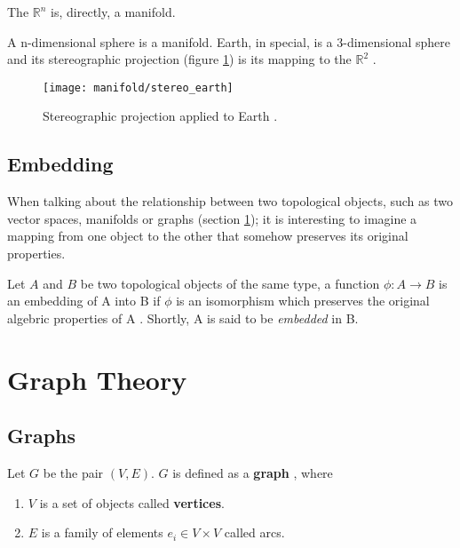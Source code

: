 \begin{example}
	The $\mathbb{R}^n$ is, directly, a manifold.
\end{example}

\begin{example}
	A n-dimensional sphere is a manifold. Earth, in special, is a 3-dimensional sphere and its stereographic projection (figure \ref{fig:stereographic_earth}) is its mapping to the $\mathbb{R}^2$ \cite{stereo_proj}.

	\begin{figure}[H]
		\centering
		\captionsetup{justification=centering}

		\texttt{[image: manifold/stereo\_earth]}
		\caption{Stereographic projection applied to Earth \cite{stereo_proj}.}
		\label{fig:stereographic_earth}
	\end{figure}
\end{example}

\subsection{Embedding}

When talking about the relationship between two topological objects, such as two vector spaces, manifolds or graphs (section \ref{sec:graphs}); it is interesting to imagine a mapping from one object to the other that somehow preserves its original properties.

Let $A$ and $B$ be two topological objects of the same type, a function $\phi \colon A \to B$ is an embedding of A into B if $\phi$ is an isomorphism which preserves the original algebric properties of A \cite{burris2011course}. Shortly, A is said to be \textit{embedded} in B.

\section{Graph Theory}
\label{sec:graphs}
\subsection{Graphs}

Let $G$ be the pair $(V, E)$. $G$ is defined as a \textbf{graph} \cite{berge1973}, where
\begin{enumerate}
	\item $V$ is a set of objects called \textbf{vertices}.
	\item $E$ is a family of elements $e_i \in V\times V$ called arcs.
\end{enumerate}

